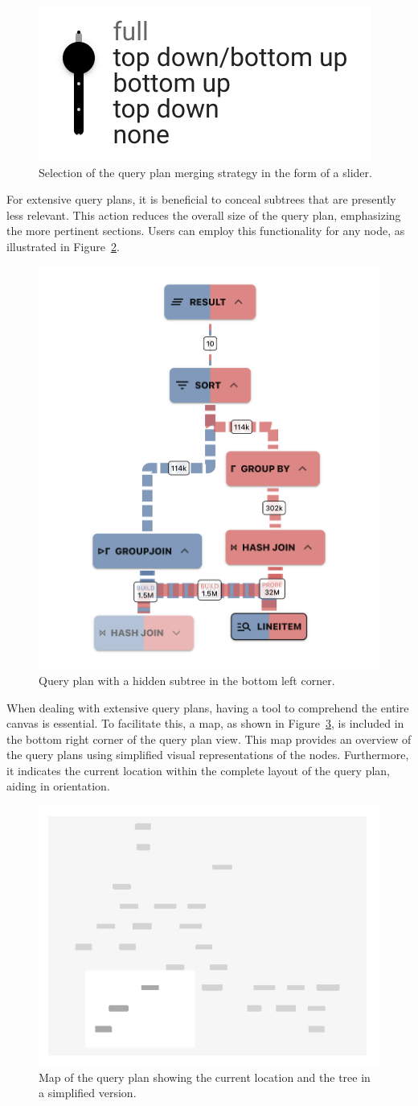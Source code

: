 \begin{figure}[h]
  \centering
  \includegraphics[width=0.25\linewidth]{figures/query-plan-slider.png}
  \caption{Selection of the query plan merging strategy in the form of a slider.}
  \label{fig:query-plan-slider}
\end{figure}

For extensive query plans, it is beneficial to conceal subtrees that are presently less relevant. This action reduces the overall size of the query plan, emphasizing the more pertinent sections. Users can employ this functionality for any node, as illustrated in Figure~\ref{fig:query-plan-hide-subtree}.

\begin{figure}[h]
  \centering
  \includegraphics[width=0.35\linewidth]{figures/query-plan-hide-subtree.png}
  \caption{Query plan with a hidden subtree in the bottom left corner.}
  \label{fig:query-plan-hide-subtree}
\end{figure}

When dealing with extensive query plans, having a tool to comprehend the entire canvas is essential. To facilitate this, a map, as shown in Figure~\ref{fig:query-plan-map}, is included in the bottom right corner of the query plan view. This map provides an overview of the query plans using simplified visual representations of the nodes. Furthermore, it indicates the current location within the complete layout of the query plan, aiding in orientation.

\begin{figure}[h]
  \centering
  \includegraphics[width=0.25\linewidth]{figures/query-plan-map.png}
  \caption{Map of the query plan showing the current location and the tree in a simplified version.}
  \label{fig:query-plan-map}
\end{figure}

